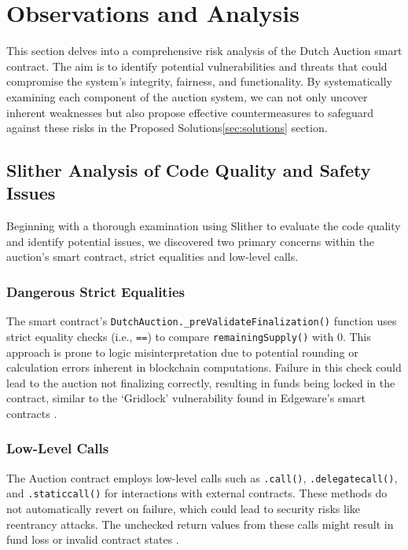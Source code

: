 \documentclass[conference]{IEEEtran}
\begin{document}
\section{Observations and Analysis}
This section delves into a comprehensive risk analysis of the Dutch Auction smart contract. The aim is to identify potential vulnerabilities and threats that could compromise the system's integrity, fairness, and functionality. By systematically examining each component of the auction system, we can not only uncover inherent weaknesses but also propose effective countermeasures to safeguard against these risks in the Proposed Solutions\ref{sec:solutions} section.

\subsection{Slither Analysis of Code Quality and Safety Issues}
Beginning with a thorough examination using Slither to evaluate the code quality and identify potential issues, we discovered two primary concerns within the auction's smart contract, strict equalities and low-level calls.
\subsubsection{Dangerous Strict Equalities}
The smart contract's \texttt{DutchAuction.\_preValidateFinalization()} function uses strict equality checks (i.e., \texttt{==}) to compare \texttt{remainingSupply()} with 0. This approach is prone to logic misinterpretation due to potential rounding or calculation errors inherent in blockchain computations. Failure in this check could lead to the auction not finalizing correctly, resulting in funds being locked in the contract, similar to the ‘Gridlock’ vulnerability found in Edgeware's smart contracts \cite[Sec. 2.3, p. 15]{trailofbits2019gridlock}.


\subsubsection{Low-Level Calls}
The Auction contract employs low-level calls such as \texttt{.call()}, \texttt{.delegatecall()}, and \texttt{.staticcall()} for interactions with external contracts. These methods do not automatically revert on failure, which could lead to security risks like reentrancy attacks. The unchecked return values from these calls might result in fund loss or invalid contract states \cite[Chap. 5, p. 37]{zipfel2023lowlevelcall}.
\end{document}
